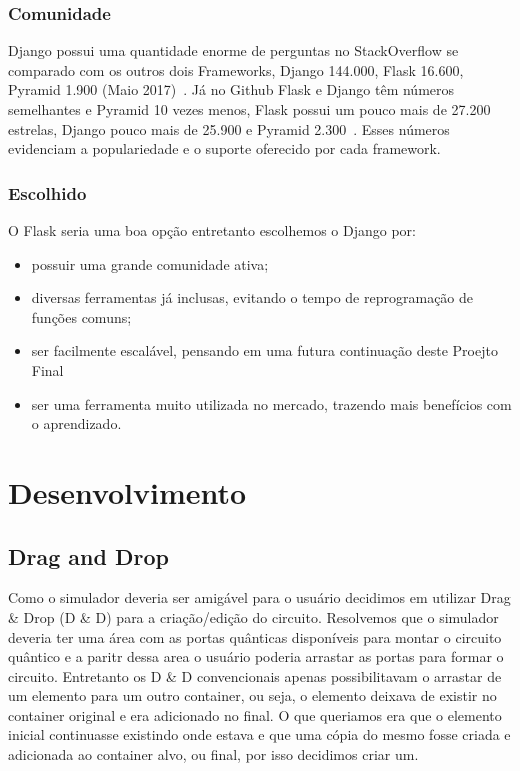 \documentclass[a4paper, 12pt, oneside]{book}
\begin{document}
\subsection{Comunidade}
Django possui uma quantidade enorme de perguntas no StackOverflow se comparado com os outros dois Frameworks, Django 144.000, Flask 16.600, Pyramid 1.900 (Maio 2017)~\cite{stackoverflowtags}. Já no Github Flask e Django têm números semelhantes e Pyramid 10 vezes menos, Flask possui um pouco mais de 27.200 estrelas, Django pouco mais de 25.900 e Pyramid 2.300~\cite{github}. Esses números evidenciam a populariedade e o suporte oferecido por cada framework.

\subsection{Escolhido}
O Flask seria uma boa opção entretanto escolhemos o Django por:
\begin{itemize}
\item possuir uma grande comunidade ativa;
\item diversas ferramentas já inclusas, evitando o tempo de reprogramação de funções comuns;
\item ser facilmente escalável, pensando em uma futura continuação deste Proejto Final
\item ser uma ferramenta muito utilizada no mercado, trazendo mais benefícios com o aprendizado.
\end{itemize}


\chapter{Desenvolvimento}
\thispagestyle{empty} 

\section{Drag and Drop}

Como o simulador deveria ser amigável para o usuário decidimos em utilizar Drag \& Drop (D \& D) para a criação/edição do circuito. Resolvemos que o simulador deveria ter uma área com as portas quânticas disponíveis para montar o circuito quântico e a paritr dessa area o usuário poderia arrastar as portas para formar o circuito. Entretanto os D \& D convencionais apenas possibilitavam o arrastar de um elemento para um outro container, ou seja, o elemento deixava de existir no container original e era adicionado no final. O que queriamos era que o elemento inicial continuasse existindo onde estava e que uma cópia do mesmo fosse criada e adicionada ao container alvo, ou final, por isso decidimos criar um.
\end{document}
